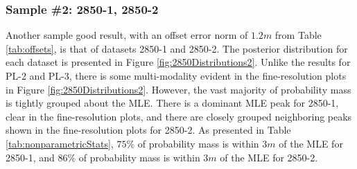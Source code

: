 \subsubsection{Sample \#2: 2850-1, 2850-2}
\label{rov.Truth.Good2}

Another sample good result, with an offset error norm of $1.2m$ from Table \ref{tab:offsets}, is that of datasets 2850-1 and 2850-2.
The posterior distribution for each dataset is presented in Figure \ref{fig:2850Distributions2}.
Unlike the results for PL-2 and PL-3, there is some multi-modality evident in the fine-resolution plots in Figure \ref{fig:2850Distributions2}.
However, the vast majority of probability mass is tightly grouped about the MLE.
There is a dominant MLE peak for 2850-1, clear in the fine-resolution plots, and there are closely grouped neighboring peaks shown in the fine-resolution plots for 2850-2.
As presented in Table \ref{tab:nonparametricStats}, $75\%$ of probability mass is within $3m$ of the MLE for 2850-1, and $86\%$ of probability mass is within $3m$ of the MLE for 2850-2.

